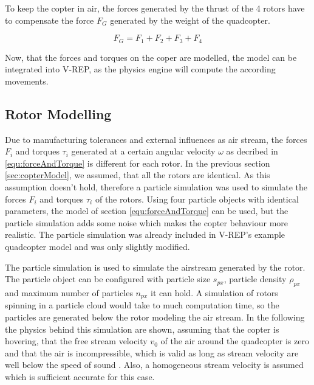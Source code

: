     To keep the copter in air, the forces generated by the thrust of the 4 rotors have to compensate the force $F_{G}$ generated by the weight of the quadcopter.
    
    \begin{equation}
    F_G = F_1 + F_2 +F_3 + F_4
    \end{equation}
    
    Now, that the forces and torques on the coper are modelled, the model can be integrated into V-REP, as the physics engine will compute the according movements.
    
    
    \subsection{Rotor Modelling}
    
    
    
    
    Due to manufacturing tolerances and external influences as air stream, the forces $F_i$ and torques $\tau_i$ generated at a certain angular velocity $\omega$ as decribed in \ref{equ:forceAndTorque} is different for each rotor. 
    In the previous section \ref{sec:copterModel}, we assumed, that all the rotors are identical. 
    As this assumption doesn't hold, therefore a particle simulation was used to simulate the forces $F_i$ and torques $\tau_i$ of the rotors. 
    Using four particle objects with identical parameters, the model of section \ref{equ:forceAndTorque} can be used, but the particle simulation adds some noise which makes the copter behaviour more realistic. 
    The particle simulation was already included in V-REP's example quadcopter model and was only slightly modified.
    
    The particle simulation is used to simulate the airstream generated by the rotor. 
    The particle object can be configured with  particle size $s_{px}$, particle density $\rho_{px}$ and maximum number of particles $n_{px}$ it can hold. 
    A simulation of rotors spinning in a particle cloud would take to much computation time, so the  particles are generated below the rotor modeling the air stream. 
    In the following the physics behind this simulation are shown, assuming that the copter is hovering, that the free stream velocity $v_0$ of the air around the quadcopter is zero and that the air is incompressible, which is valid as long as stream velocity are well below the speed of sound \cite{Lautrup2011PhysicsContinuous}.
     Also, a homogeneous stream velocity is assumed which is sufficient accurate for this case. 
    
